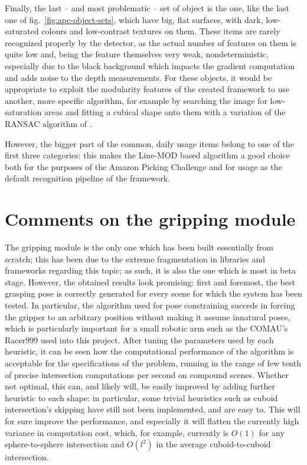 Finally, the last -- and most problematic -- set of object is the one,
like the last one of fig.~\ref{fig:apc-object-sets}, which have big,
flat surfaces, with dark, low-saturated colours and low-contrast
textures on them. These items are rarely recognized properly by the
detector, as the actual number of features on them is quite low and,
being the feature themselves very weak, nondeterministic, especially
due to the black background which impacts the gradient computation and
adds noise to the depth measurements. For these objects, it would be
appropriate to exploit the modularity features of the created
framework to use another, more specific algorithm, for example by
searching the image for low-saturation areas and fitting a cubical
shape onto them with a variation of the RANSAC algorithm of \cite{ransac}.

However, the bigger part of the common, daily usage items belong to
one of the first three categories: this makes the Line-MOD based
algorithm a good choice both for the purposes of the Amazon Picking
Challenge and for usage as the default recognition pipeline of the
framework.

\section{Comments on the gripping module}
The gripping module is the only one which has been built essentially from scratch;
this has been due to the extreme fragmentation in libraries and
frameworks regarding this topic; as such, it is also the one which is
most in beta stage. However, the obtained results look promising:
first and foremost, the best grasping pose is correctly generated for
every scene for which the system has been tested. In particular, the
algorithm used for pose constraining succeds in forcing the gripper to
an arbitrary position without making it assume innatural poses, which
is particularly important for a small robotic arm such as the COMAU's
Racer999 used into this project.
After tuning the parameters used by each heuristic, it can be seen how
the computational performance of the algorithm is acceptable for the
specifications of the problem, running in the range of few tenth of
precise intersection computations per second on compound
scenes. Whether not optimal, this can, and likely will, be easily
improved by adding further heuristic to each shape: in particular,
some trivial heuristics such as cuboid intersection's skipping have
still not been implemented, and are easy to. This will for sure
improve the performance, and especially it will flatten the currently
high variance in computation cost, which, for example, currently is
$O(1)$ for any sphere-to-sphere intersection and $O(l^2)$ in the
average cuboid-to-cuboid intersection.

